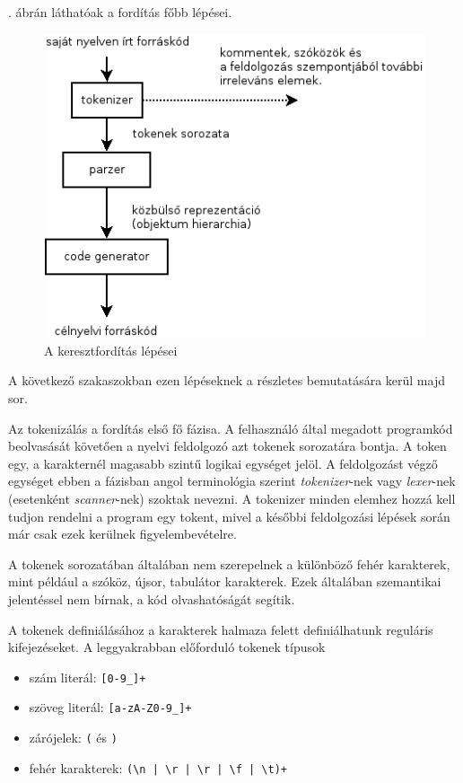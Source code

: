 . ábrán láthatóak a fordítás főbb lépései.
\begin{figure}
\centering
\includegraphics[scale=1]{kepek/process.png}
\caption{A keresztfordítás lépései}
\label{fig:process}
\end{figure}
A következő szakaszokban ezen lépéseknek a részletes bemutatására kerül majd sor.


Az tokenizálás a fordítás első fő fázisa. A felhasználó által megadott programkód beolvasását követően a nyelvi feldolgozó azt tokenek sorozatára bontja.
A token egy, a karakternél magasabb szintű logikai egységet jelöl.
A feldolgozást végző egységet ebben a fázisban angol terminológia szerint \textit{tokenizer}-nek vagy \textit{lexer}-nek (esetenként \textit{scanner}-nek) szoktak nevezni.
A tokenizer minden elemhez hozzá kell tudjon rendelni a program egy tokent, mivel a későbbi feldolgozási lépések során már csak ezek kerülnek figyelembevételre.

A tokenek sorozatában általában nem szerepelnek a különböző fehér karakterek, mint például a szóköz, újsor, tabulátor karakterek.
Ezek általában szemantikai jelentéssel nem bírnak, a kód olvashatóságát segítik.

A tokenek definiálásához a karakterek halmaza felett definiálhatunk reguláris kifejezéseket.
A leggyakrabban előforduló tokenek típusok
\begin{itemize}
\item szám literál: \texttt{[0-9\_]+}
\item szöveg literál: \texttt{[a-zA-Z0-9\_]+}
\item zárójelek: \texttt{(} és \texttt{)}
\item fehér karakterek: \verb$(\n | \r | \r | \f | \t)+$
\end{itemize}

